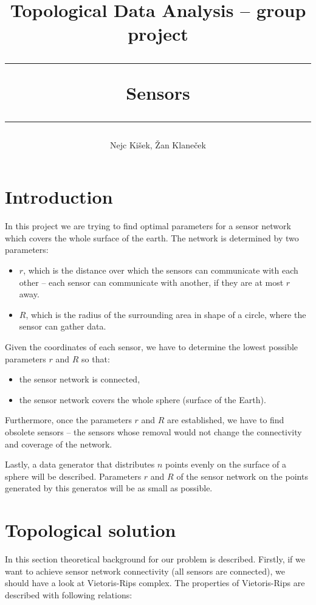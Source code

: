 \documentclass[a4paper, 12pt]{article}
\title{
{	\vspace{3mm}
	\large Topological Data Analysis -- group project} \\
	\vspace{5mm}
	\hrule
	\vspace{3mm}
Sensors
	\vspace{3mm}
	\hrule
	\vspace{5mm}
}
\author{
	Nejc Ki\v sek,
	\v Zan Klane\v cek
}
\begin{document}
\maketitle

\vspace{8mm}


\section{Introduction}
In this project we are trying to find optimal parameters for a sensor network which covers the whole surface of the earth. The network is determined by two parameters: 
\begin{itemize}
	\item $r$, which is the distance over which the sensors can communicate with each other -- each sensor can communicate with another, if they are at most $r$ away.
	\item $R$, which is the radius of the surrounding area in shape of a circle, where the sensor can gather data.
\end{itemize}

\noindent Given the coordinates of each sensor, we have to determine the lowest possible parameters $r$ and $R$ so that:

\begin{itemize}
	\item {the sensor network is connected,}
	\item {the sensor network covers the whole sphere (surface of the Earth).}
\end{itemize}
Furthermore, once the parameters $r$ and $R$ are established, we have to find obsolete sensors -- the sensors whose removal would not change the connectivity and coverage of the network. 

Lastly, a data generator that distributes $n$ points evenly on the surface of a sphere will be described. Parameters $r$ and $R$ of the sensor network on the points generated by this generatos will be as small as possible.
\section{Topological solution}

In this section theoretical background for our problem is described. Firstly, if we want to achieve sensor network connectivity (all sensors are connected), we should have a look at Vietoris-Rips complex. The properties of Vietoris-Rips are described with following relations:
\end{document}
